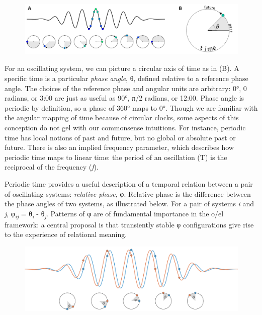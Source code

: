   
\begin{figure}
\includegraphics[width=\textwidth]{figures/Tilsen-img2.png}
\caption{\missingcaption}
\label{fig:1:2}
\end{figure}
 

  For an oscillating system, we can picture a circular axis of time as in (B). A specific time is a particular \textit{phase angle}, θ, defined relative to a reference phase angle. The choices of the reference phase and angular units are arbitrary: 0°, 0 radians, or 3:00 are just as useful as 90°, π/2 radians, or 12:00. Phase angle is periodic by definition, so a phase of 360° maps to 0°. Though we are familiar with the angular mapping of time because of circular clocks, some aspects of this conception do not gel with our commonsense intuitions. For instance, periodic time has local notions of past and future, but no global or absolute past or future. There is also an implied frequency parameter, which describes how periodic time maps to linear time: the period of an oscillation (T) is the reciprocal of the frequency (\textit{f}).

  Periodic time provides a useful description of a temporal relation between a pair of oscillating systems: \textit{relative phase}, φ. Relative phase is the difference between the phase angles of two systems, as illustrated below. For a pair of systems \textit{i} and \textit{j}, φ\textit{\textsubscript{ij}}\textsubscript{} = θ\textit{\textsubscript{i}} - θ\textit{\textsubscript{j}}. Patterns of φ are of fundamental importance in the o/el framework: a central proposal is that transiently stable φ configurations give rise to the experience of relational meaning.  

  
\begin{figure}
\includegraphics[width=\textwidth]{figures/Tilsen-img3.png}
\caption{\missingcaption}
\label{fig:1:3}
\end{figure}
 

